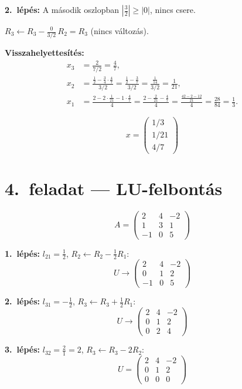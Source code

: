 \documentclass[a4paper,12pt]{article}
\begin{document}
\textbf{2.\ lépés:} A második oszlopban $|\frac{3}{2}| \ge |0|$, nincs csere.

$R_3 \leftarrow R_3 - \frac{0}{3/2}\,R_2 = R_3$ (nincs változás).

\textbf{Visszahelyettesítés:}
\begin{align}
x_3 &= \frac{2}{7/2} = \frac{4}{7}, \\[4pt]
x_2 &= \frac{\frac{1}{2} - \frac{3}{4}\cdot\frac{4}{7}}{3/2} = \frac{\frac{1}{2} - \frac{3}{7}}{3/2} = \frac{\frac{1}{14}}{3/2} = \frac{1}{21}, \\[4pt]
x_1 &= \frac{2 - 2\cdot\frac{1}{21} - 1\cdot\frac{4}{7}}{4} = \frac{2 - \frac{2}{21} - \frac{4}{7}}{4} = \frac{\frac{42-2-12}{21}}{4} = \frac{28}{84} = \frac{1}{3}.
\end{align}

\[
\boxed{x = \begin{pmatrix} 1/3 \\ 1/21 \\ 4/7 \end{pmatrix}}
\]

\section*{4.\ feladat --- LU-felbontás}

\[
A = \begin{pmatrix} 2 & 4 & -2 \\ 1 & 3 & 1 \\ -1 & 0 & 5 \end{pmatrix}
\]

\textbf{1.\ lépés:} $l_{21} = \frac{1}{2}$, \; $R_2 \leftarrow R_2 - \frac{1}{2}R_1$:
\[
U \to \begin{pmatrix} 2 & 4 & -2 \\ 0 & 1 & 2 \\ -1 & 0 & 5 \end{pmatrix}
\]

\textbf{2.\ lépés:} $l_{31} = -\frac{1}{2}$, \; $R_3 \leftarrow R_3 + \frac{1}{2}R_1$:
\[
U \to \begin{pmatrix} 2 & 4 & -2 \\ 0 & 1 & 2 \\ 0 & 2 & 4 \end{pmatrix}
\]

\textbf{3.\ lépés:} $l_{32} = \frac{2}{1} = 2$, \; $R_3 \leftarrow R_3 - 2R_2$:
\[
U = \begin{pmatrix} 2 & 4 & -2 \\ 0 & 1 & 2 \\ 0 & 0 & 0 \end{pmatrix}
\]
\end{document}
